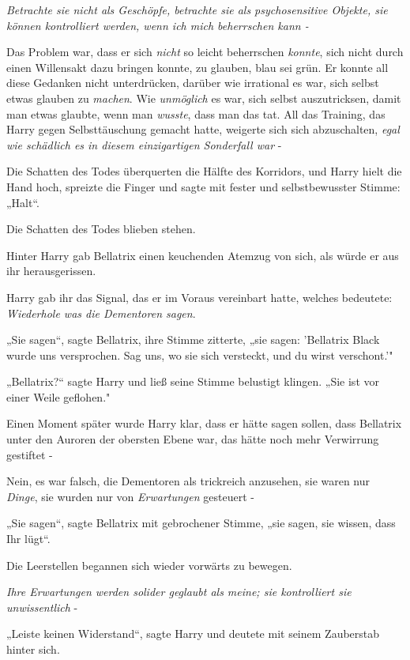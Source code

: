 {\emph{\emph{Betrachte sie nicht als Geschöpfe, betrachte sie als psychosensitive Objekte, sie können kontrolliert werden, wenn ich mich beherrschen kann -}}

Das Problem war, dass er sich \emph{nicht} so leicht beherrschen \emph{konnte}, sich nicht durch einen Willensakt dazu bringen konnte, zu glauben, blau sei grün. Er konnte all diese Gedanken nicht unterdrücken, darüber wie irrational es war, sich selbst etwas glauben zu \emph{machen}. Wie \emph{unmöglich} es war, sich selbst auszutricksen, damit man etwas glaubte, wenn man \emph{wusste}, dass man das tat. All das Training, das Harry gegen Selbsttäuschung gemacht hatte, weigerte sich sich abzuschalten, \emph{egal wie schädlich es in diesem einzigartigen Sonderfall war} -

Die Schatten des Todes überquerten die Hälfte des Korridors, und Harry hielt die Hand hoch, spreizte die Finger und sagte mit fester und selbstbewusster Stimme: „Halt“.

Die Schatten des Todes blieben stehen.

Hinter Harry gab Bellatrix einen keuchenden Atemzug von sich, als würde er aus ihr herausgerissen.

Harry gab ihr das Signal, das er im Voraus vereinbart hatte, welches bedeutete: \emph{Wiederhole was die Dementoren sagen}.

„Sie sagen“, sagte Bellatrix, ihre Stimme zitterte, „sie sagen: 'Bellatrix Black wurde uns versprochen. Sag uns, wo sie sich versteckt, und du wirst verschont.'"

„Bellatrix?“ sagte Harry und ließ seine Stimme belustigt klingen. „Sie ist vor einer Weile geflohen."

Einen Moment später wurde Harry klar, dass er hätte sagen sollen, dass Bellatrix unter den Auroren der obersten Ebene war, das hätte noch mehr Verwirrung gestiftet -

Nein, es war falsch, die Dementoren als trickreich anzusehen, sie waren nur \emph{Dinge}, sie wurden nur von \emph{Erwartungen} gesteuert -

„Sie sagen“, sagte Bellatrix mit gebrochener Stimme, „sie sagen, sie wissen, dass Ihr lügt“.

Die Leerstellen begannen sich wieder vorwärts zu bewegen.

\emph{Ihre Erwartungen werden solider geglaubt als meine; sie kontrolliert sie unwissentlich} -

„Leiste keinen Widerstand“, sagte Harry und deutete mit seinem Zauberstab hinter sich.

}
